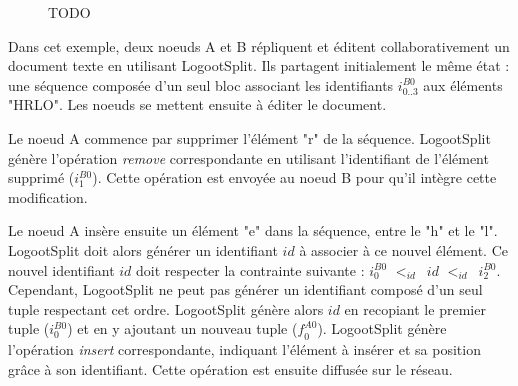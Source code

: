 \documentclass[12pt]{thesul}
\newcommand{\trm}[1]{\mathit{#1}}
\newcommand{\id}[3]{$\trm{#1}^{\trm{#2}}_{\trm{#3}}$}
\newcommand{\lid}{$<_{id}$~}
\begin{document}
\begin{figure}[!ht]
{
  }
  \caption{TODO}
  \label{fig:logootsplit-example}
\end{figure}

Dans cet exemple, deux noeuds A et B répliquent et éditent collaborativement un document texte en utilisant LogootSplit.
Ils partagent initialement le même état : une séquence composée d'un seul bloc associant les identifiants \id{i}{B0}{0..3} aux éléments "HRLO".
Les noeuds se mettent ensuite à éditer le document.

Le noeud A commence par supprimer l'élément "r" de la séquence.
LogootSplit génère l'opération \emph{remove} correspondante en utilisant l'identifiant de l'élément supprimé (\id{i}{B0}{1}).
Cette opération est envoyée au noeud B pour qu'il intègre cette modification.

Le noeud A insère ensuite un élément "e" dans la séquence, entre le "h" et le "l".
LogootSplit doit alors générer un identifiant $id$ à associer à ce nouvel élément.
Ce nouvel identifiant $id$ doit respecter la contrainte suivante : \id{i}{B0}{0} \lid $id$ \lid \id{i}{B0}{2}.
Cependant, LogootSplit ne peut pas générer un identifiant composé d'un seul tuple respectant cet ordre.
LogootSplit génère alors $id$ en recopiant le premier tuple (\id{i}{B0}{0}) et en y ajoutant un nouveau tuple (\id{f}{A0}{0}).
LogootSplit génère l'opération \emph{insert} correspondante, indiquant l'élément à insérer et sa position grâce à son identifiant.
Cette opération est ensuite diffusée sur le réseau.
\end{document}

